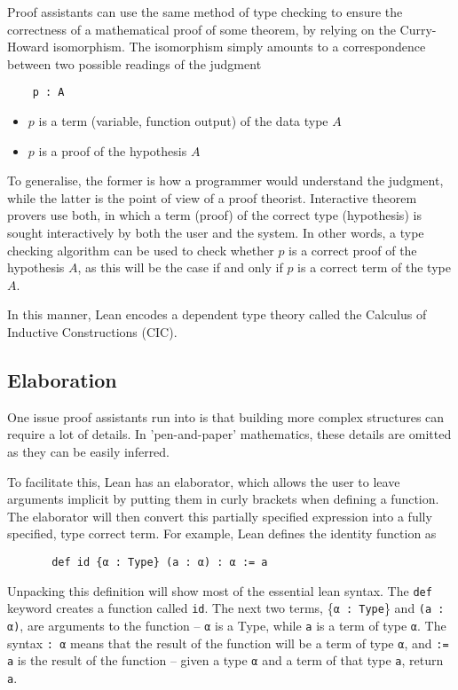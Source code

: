 \documentclass[runningheads,a4paper]{llncs}
\renewcommand{\-}{\setminus}
\begin{document}
Proof assistants can use the same method of type checking to ensure the correctness of a mathematical proof of some theorem, by relying on the Curry-Howard isomorphism. The isomorphism simply amounts to a correspondence between two possible readings of the judgment
\begin{lstlisting}
    p : A
\end{lstlisting}
\begin{itemize}
\item $p$ is a term (variable, function output) of the data type $A$
\item $p$ is a proof of the hypothesis $A$
\end{itemize}

To generalise, the former is how a programmer would understand the judgment, while the latter is the point of view of a proof theorist. Interactive theorem provers use both, in which a term (proof) of the correct type (hypothesis) is sought interactively by both the user and the system. In other words, a type checking algorithm can be used to check whether $p$ is a correct proof of the hypothesis $A$, as this will be the case if and only if $p$ is a correct term of the type $A$.

In this manner, Lean encodes a dependent type theory called the Calculus of Inductive Constructions (CIC).

\subsection{Elaboration}

One issue proof assistants run into is that building more complex structures can require a lot of details. In 'pen-and-paper' mathematics, these details are omitted as they can be easily inferred.

To facilitate this, Lean has an elaborator, which allows the user to leave arguments implicit by putting them in curly brackets when defining a function. The elaborator will then convert this partially specified expression into a fully specified, type correct term. For example, Lean defines the identity function as

\begin{lstlisting}
       def id {α : Type} (a : α) : α := a
\end{lstlisting}

Unpacking this definition will show most of the essential lean syntax. The \lstinline{def} keyword creates a function called \lstinline{id}. The next two terms, \{\lstinline{α : Type}\} and \lstinline{(a : α)}, are arguments to the function -- \lstinline{α} is a Type, while \lstinline{a} is a term of type \lstinline{α}. The syntax \lstinline{: α} means that the result of the function will be a term of type \lstinline{α}, and \lstinline{:= a} is the result of the function -- given a type \lstinline{α} and a term of that type \lstinline{a}, return \lstinline{a}.
\end{document}
